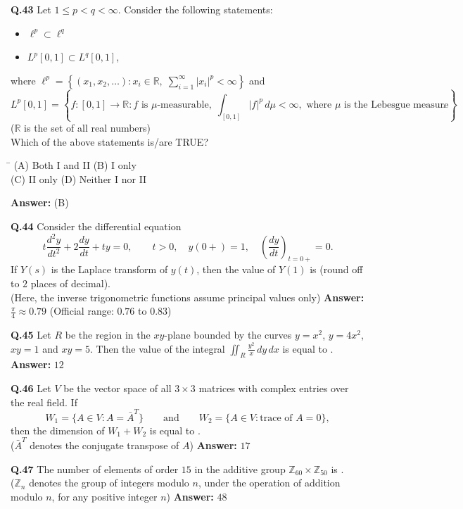 \documentclass[11pt,a4paper]{article}
\newcommand{\optsfourA}[4]{%
  \begin{tabbing}
    \hspace{0.48\linewidth}\=\kill
    (A) #1 \> (B) #2 \\[2pt]
    (C) #3 \> (D) #4
  \end{tabbing}%
}
\newcommand{\ans}[1]{\textbf{Answer:} #1\par\medskip}
\begin{document}
\textbf{Q.43} Let $1 \le p < q < \infty$. Consider the following statements:
\begin{itemize}
  \setlength{\itemsep}{1pt}\setlength{\parskip}{0pt}
  \item[I.] $\ell^p \subset \ell^q$
  \item[II.] $L^p[0, 1] \subset L^q[0, 1]$,
\end{itemize}
where $\ell^p = \left\{(x_1, x_2, \dots) : x_i \in \mathbb{R},\; \sum_{i=1}^{\infty} |x_i|^p < \infty\right\}$ and
\[
  L^p[0, 1] = \left\{f : [0, 1] \to \mathbb{R} : f \text{ is } \mu\text{-measurable},\; \int_{[0, 1]} |f|^p\,d\mu < \infty, \text{ where } \mu \text{ is the Lebesgue measure}\right\}.
\]
($\mathbb{R}$ is the set of all real numbers)\\
Which of the above statements is/are TRUE?
\optsfourA{Both I and II}{I only}{II only}{Neither I nor II}
\ans{(B)}

\textbf{Q.44} Consider the differential equation
\[
  t\frac{d^2 y}{dt^2} + 2\frac{dy}{dt} + t y = 0, \qquad t > 0,\quad y(0+) = 1,\quad \left(\frac{dy}{dt}\right)_{t=0+} = 0.
\]
If $Y(s)$ is the Laplace transform of $y(t)$, then the value of $Y(1)$ is \underline{\hspace{2cm}} (round off to $2$ places of decimal).\\
(Here, the inverse trigonometric functions assume principal values only)
\ans{$\frac{\pi}{4} \approx 0.79$ (Official range: $0.76$ to $0.83$)}

\textbf{Q.45} Let $R$ be the region in the $xy$-plane bounded by the curves $y = x^2$, $y = 4x^2$, $xy = 1$ and $xy = 5$. Then the value of the integral $\displaystyle\iint_R \frac{y^2}{x}\,dy\,dx$ is equal to \underline{\hspace{2cm}}.
\ans{$12$}

\textbf{Q.46} Let $V$ be the vector space of all $3 \times 3$ matrices with complex entries over the real field. If
\[
  W_1 = \{A \in V : A = \bar{A}^T\} \qquad \text{and} \qquad W_2 = \{A \in V : \text{trace of } A = 0\},
\]
then the dimension of $W_1 + W_2$ is equal to \underline{\hspace{2cm}}.\\
($\bar{A}^T$ denotes the conjugate transpose of $A$)
\ans{$17$}

\textbf{Q.47} The number of elements of order $15$ in the additive group $\mathbb{Z}_{60} \times \mathbb{Z}_{50}$ is \underline{\hspace{2cm}}.\\
($\mathbb{Z}_n$ denotes the group of integers modulo $n$, under the operation of addition modulo $n$, for any positive integer $n$)
\ans{$48$}
\end{document}
